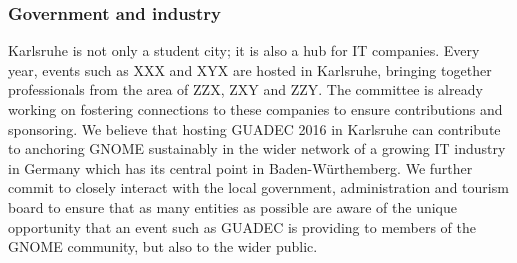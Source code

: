 \subsubsection{ Government and industry}

Karlsruhe is not only a student city; it is also a hub for IT companies. Every year, events such as XXX and XYX are hosted in Karlsruhe, bringing together professionals from the area of ZZX, ZXY and ZZY. The committee is already working on fostering connections to these companies to ensure contributions and sponsoring. We believe that hosting GUADEC 2016 in Karlsruhe can contribute to anchoring GNOME sustainably in the wider network of a growing IT industry in Germany which has its central point in Baden-Würthemberg. We further commit to closely interact with the local government, administration and tourism board to ensure that as many entities as possible are aware of the unique opportunity that an event such as GUADEC is providing to members of the GNOME community, but also to the wider public.  
